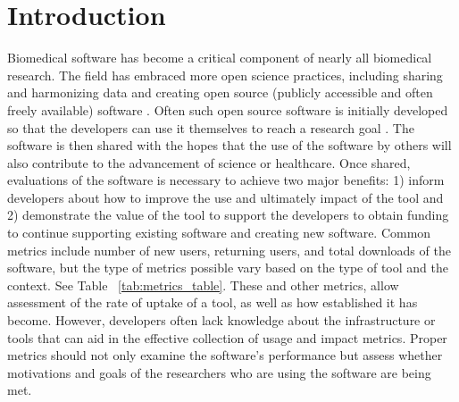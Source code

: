 \documentclass{article}
\begin{document}
\section{Introduction} Biomedical software has become a critical component of nearly all biomedical research. The field has embraced more open science practices, including sharing and harmonizing data and creating open source (publicly accessible and often freely available) software \cite{green_strategic_2020, levet_developing_2021, itcr_open-source_2021, merow_better_2023}. Often such open source software is initially developed so that the developers can use it themselves to reach a research goal \cite{bitzer_intrinsic_2007}. The software is then shared with the hopes that the use of the software by others will also contribute to the advancement of science or healthcare. Once shared, evaluations of the software is necessary to achieve two major benefits: 1) inform developers about how to improve the use and ultimately impact of the tool and 2) demonstrate the value of the tool to support the developers to obtain funding to continue supporting existing software and creating new software. Common metrics include number of new users, returning users, and total downloads of the software, but the type of metrics possible vary based on the type of tool and the context. See Table ~\ref{tab:metrics_table}. These and other metrics, allow assessment of the rate of uptake of a tool, as well as how established it has become. However, developers often lack knowledge about the infrastructure or tools that can aid in the effective collection of usage and impact metrics. Proper metrics should not only examine the software's performance but assess whether motivations and goals of the researchers who are using the software are being met.
\end{document}

